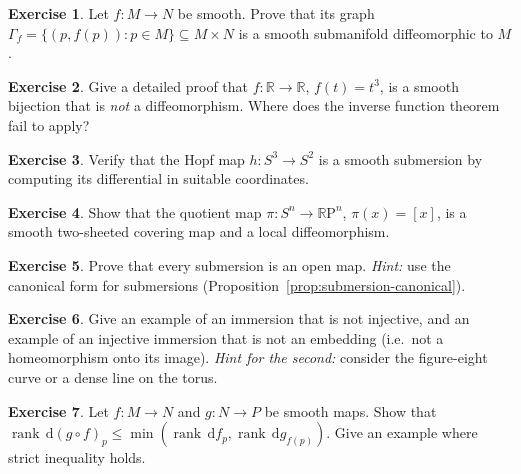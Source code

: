 \documentclass[12pt,a4paper,openany]{book}
\theoremstyle{definition}
\newtheorem{exercise}{Exercise}[chapter]
\theoremstyle{remark}
\newcommand{\R}{\mathbb{R}}
\newcommand{\RP}{\mathbb{R}\mathrm{P}}
\newcommand{\dd}{\,\mathrm{d}}
\DeclareMathOperator{\rank}{rank}
\begin{document}
\begin{exercise}\label{exo:graph-submanifold}
Let $f \colon M \to N$ be smooth.  Prove that its graph
$\Gamma_f = \{(p, f(p)) : p \in M\} \subseteq M \times N$ is a smooth
submanifold diffeomorphic to $M$.
\end{exercise}

\begin{exercise}\label{exo:smooth-bijection-not-diffeo}
Give a detailed proof that $f \colon \R \to \R$, $f(t) = t^3$, is a smooth
bijection that is \emph{not} a diffeomorphism.  Where does the inverse
function theorem fail to apply?
\end{exercise}

\begin{exercise}\label{exo:hopf-submersion}
Verify that the Hopf map $h \colon S^3 \to S^2$ is a smooth submersion by
computing its differential in suitable coordinates.
\end{exercise}

\begin{exercise}\label{exo:quotient-RPn}
Show that the quotient map $\pi \colon S^n \to \RP^n$,
$\pi(x) = [x]$, is a smooth two-sheeted covering map and a local
diffeomorphism.
\end{exercise}

\begin{exercise}\label{exo:submersion-open}
Prove that every submersion is an open map.
\textit{Hint:} use the canonical form for submersions
(Proposition~\ref{prop:submersion-canonical}).
\end{exercise}

\begin{exercise}\label{exo:immersion-injective}
Give an example of an immersion that is not injective, and an example of
an injective immersion that is not an embedding (i.e.\ not a homeomorphism
onto its image).  \textit{Hint for the second:} consider the figure-eight
curve or a dense line on the torus.
\end{exercise}

\begin{exercise}\label{exo:constant-rank-composition}
Let $f \colon M \to N$ and $g \colon N \to P$ be smooth maps.
Show that $\rank \dd(g \circ f)_p \leq \min(\rank \dd f_p, \rank \dd g_{f(p)})$.
Give an example where strict inequality holds.
\end{exercise}
\end{document}
